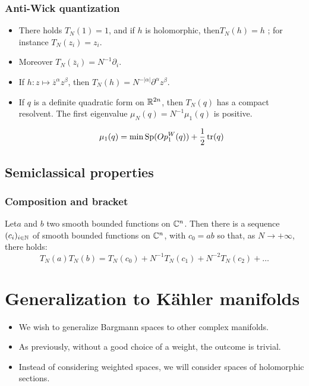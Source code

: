\documentclass[mathserif]{beamer}
\begin{document}
\begin{frame}\frametitle{Anti-Wick quantization}
		\begin{itemize}
		\item<1-> There holds $T_N(1)=1$, and if $h$ is
                  holomorphic, then$T_N(h)=h$ ; for instance $T_N(z_i)=z_i$.
		
		\item<2-> Moreover $T_N(\overline{z}_i)=N^{-1}\partial_i.$
		
		\item<3-> If $h:z\mapsto \overline{z}^{\alpha}z^{\beta}$, then $T_N(h)=N^{-|\alpha|}\partial^{\alpha}z^{\beta}$.
		
		\item<4-> If $q$ is a definite quadratic form on 
                  $\mathbb{R}^{2n}$, then $T_N(q)$ has a compact
                  resolvent. The first eigenvalue
                  $\mu_N(q)=N^{-1}\mu_1(q)$ is positive.

                  \begin{equation*}
                    \mu_1(q)=\min \operatorname{Sp}(Op^W_1(q)) + \frac 12 \operatorname{tr}(q)
                  \end{equation*}
		\end{itemize}
\end{frame}

\subsection{Semiclassical properties}
\begin{frame}\frametitle{Composition and bracket}
	\begin{prop}
		Let$a$ and $b$ two smooth bounded functions on
                $\mathbb{C}^n$. Then there is a sequence $(c_i)_{i\in \mathbb{N}}$ of
                smooth bounded functions on $\mathbb{C}^n$, with $c_0=ab$ so
                that, as $N\to +\infty$, there holds:
		\begin{equation*}
			T_N(a)T_N(b)=T_N(c_0)+N^{-1}T_N(c_1)+N^{-2}T_N(c_2)+\ldots
		\end{equation*}
		
	\end{prop}
\end{frame}

\section{Generalization to K\"ahler manifolds}
\begin{frame}
	\begin{itemize}
		\item We wish to generalize Bargmann spaces to other
                  complex manifolds.
		\item As previously, without a good choice of a
                  weight, the outcome is trivial.
		\item<2> Instead of considering weighted spaces, we
                  will consider spaces of holomorphic sections.
	\end{itemize}
\end{frame}
\end{document}
